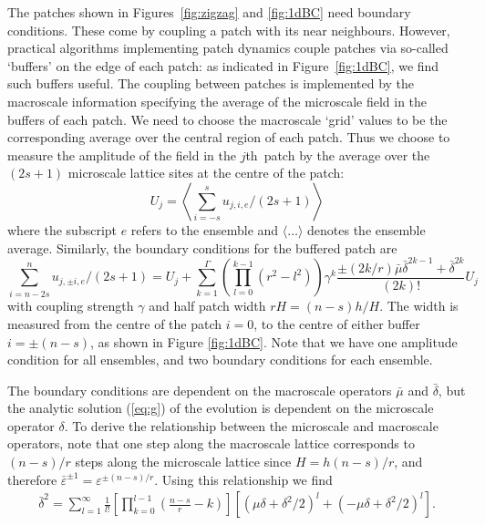 \documentclass[12pt,a4paper]{article}
\begin{document}
The patches shown in Figures~\ref{fig:zigzag} and \ref{fig:1dBC} need boundary conditions.  These come by coupling a patch with its near neighbours.  However, practical algorithms implementing patch dynamics couple patches via so-called `buffers' on the edge of each patch: as indicated in Figure~\ref{fig:1dBC}, we find such buffers useful.  The coupling between patches is implemented by the macroscale information specifying the average of the microscale field in the buffers of each patch.
We need to choose the macroscale `grid' values to be the corresponding average over the central region of each patch.  Thus we choose to measure the amplitude of the field in the $j$th~patch by the average over the $(2s+1)$ microscale lattice sites at the centre of the patch:
\begin{equation}
U_j=\left\langle\sum_{i=-s}^su_{j,i,e}/(2s+1)\right\rangle\label{eq:amp2}
\end{equation}
where the subscript $e$ refers to the ensemble and $\langle\ldots\rangle$ denotes the ensemble average. Similarly, the boundary conditions for the buffered patch are
\begin{equation}
\sum_{i=n-2s}^nu_{j,\pm i,e}/(2s+1)=U_j+\sum_{k=1}^{\Gamma}\left(\prod_{l=0}^{k-1}(r^2-l^2)\right)\gamma^k\frac{\pm (2k/r)\bar{\mu}\bar{\delta}^{2k-1}+\bar{\delta}^{2k}}{(2k)!}U_j\label{eq:bc2}
\end{equation}
with coupling strength $\gamma$ and half patch width $rH=(n-s)h/H$. The width is measured from the centre of the patch $i=0$, to the centre of either buffer $i=\pm(n-s)$, as shown in Figure \ref{fig:1dBC}. Note that we have one amplitude condition for all ensembles, and two boundary conditions for each ensemble. 
 
The boundary conditions are dependent on the macroscale operators $\bar{\mu}$ and $\bar{\delta}$, but the analytic solution (\ref{eq:g}) of the evolution is dependent on the microscale operator $\delta$. To derive the relationship between the microscale and macroscale operators, note that one step along the macroscale lattice corresponds to $(n-s)/r$ steps along the microscale lattice since $H=h(n-s)/r$, and therefore $\bar{\varepsilon}^{\pm 1}=\varepsilon ^{\pm(n-s)/r}$. Using this relationship we find
\begin{align}
\bar{\delta}^2=\sum_{l=1}^{\infty}\frac{1}{l!}\left[\prod_{k=0}^{l-1}\left(\frac{n-s}{r}-k\right)\right]\left[(\mu\delta+\delta^2/2)^l+(-\mu\delta+\delta^2/2)^l\right].
\end{align}
\end{document}
